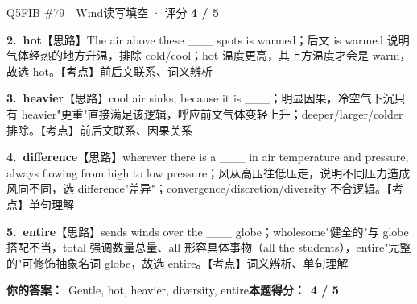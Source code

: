 \documentclass[11pt]{article}
\begin{document}
\begin{qblock}{Q5\quad FIB \#79\ \ Wind}{读写填空 · 评分 \textcolor{cAccent}{\bfseries 4 / 5}}
\begin{notebox}
\textbf{2.\ hot}\quad【思路】The air above these \_\_\_ spots is warmed；后文 is warmed 说明气体经热的地方升温，排除 cold/cool；hot 温度更高，其上方温度才会是 warm，故选 hot。【考点】前后文联系、词义辨析\par\smallskip
\textbf{3.\ heavier}\quad【思路】cool air sinks, because it is \_\_\_；明显因果，冷空气下沉只有 heavier"更重"直接满足该逻辑，呼应前文气体变轻上升；deeper/larger/colder 排除。【考点】前后文联系、因果关系\par\smallskip
\textbf{4.\ difference}\quad【思路】wherever there is a \_\_\_ in air temperature and pressure, always flowing from high to low pressure；风从高压往低压走，说明不同压力造成风向不同，选 difference"差异"；convergence/discretion/diversity 不合逻辑。【考点】单句理解\par\smallskip
\textbf{5.\ entire}\quad【思路】sends winds over the \_\_\_ globe；wholesome"健全的"与 globe 搭配不当，total 强调数量总量、all 形容具体事物（all the students），entire"完整的"可修饰抽象名词 globe，故选 entire。【考点】词义辨析、单句理解
\end{notebox}
\smallskip
\textbf{你的答案：}\ Gentle, hot, heavier, {\color{cWrong}diversity}, entire\qquad\textbf{本题得分：}\ {\color{cAccent}\bfseries 4 / 5}
\end{qblock}
\end{document}

